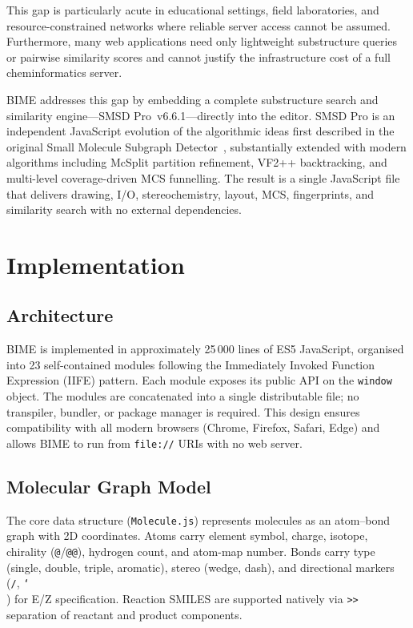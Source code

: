 \documentclass[twocolumn]{article}
\begin{document}
This gap is particularly acute in educational settings, field
laboratories, and resource-constrained networks where reliable server
access cannot be assumed.  Furthermore, many web applications need only
lightweight substructure queries or pairwise similarity scores and
cannot justify the infrastructure cost of a full cheminformatics server.

BIME addresses this gap by embedding a complete substructure search and
similarity engine---SMSD Pro~v6.6.1---directly into the editor.  SMSD
Pro is an independent JavaScript evolution of the algorithmic ideas
first described in the original Small Molecule Subgraph
Detector~\citep{Rahman2009}, substantially extended with modern
algorithms including McSplit partition refinement, VF2++ backtracking,
and multi-level coverage-driven MCS funnelling.  The result is a single
JavaScript file that delivers drawing, I/O, stereochemistry, layout, MCS,
fingerprints, and similarity search with no external dependencies.

\section{Implementation}

\subsection{Architecture}

BIME is implemented in approximately 25\,000 lines of ES5 JavaScript,
organised into 23 self-contained modules following the Immediately
Invoked Function Expression (IIFE) pattern.  Each module exposes its
public API on the \texttt{window} object.  The modules are concatenated
into a single distributable file; no transpiler, bundler, or package
manager is required.  This design ensures compatibility with all modern
browsers (Chrome, Firefox, Safari, Edge) and allows BIME to run from
\texttt{file://} URIs with no web server.

\subsection{Molecular Graph Model}

The core data structure (\texttt{Molecule.js}) represents molecules as
an atom--bond graph with 2D coordinates.  Atoms carry element symbol,
charge, isotope, chirality (\texttt{@}/\texttt{@@}), hydrogen count, and
atom-map number.  Bonds carry type (single, double, triple, aromatic),
stereo (wedge, dash), and directional markers (\texttt{/},
\texttt{\char`\\}) for E/Z specification.  Reaction SMILES are supported
natively via \texttt{>>} separation of reactant and product components.
\end{document}
